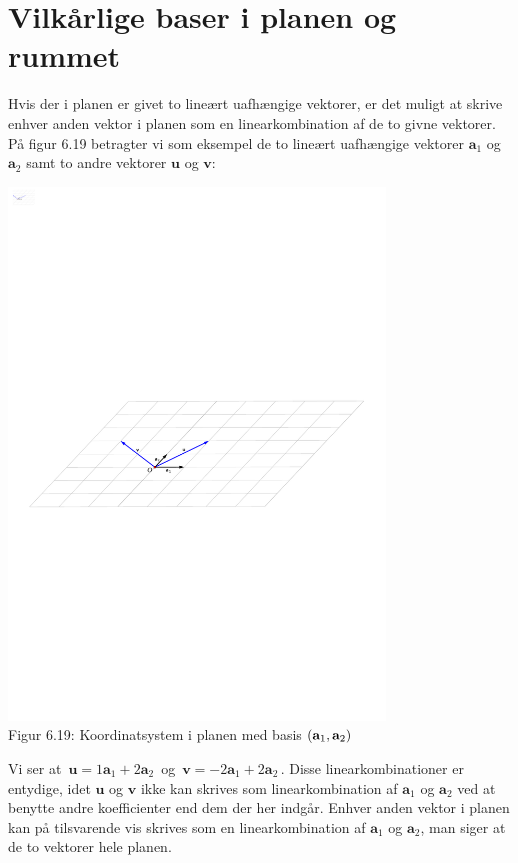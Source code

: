 \section{Vilkårlige baser i planen og rummet}
Hvis der i planen er givet to lineært uafhængige vektorer, er det muligt at skrive enhver anden vektor i planen som en linearkombination af de to givne vektorer. På figur 6.19 betragter vi som eksempel de to lineært uafhængige vektorer $\mathbf a_1$ og $\mathbf a_2$ samt to andre vektorer $\mathbf u$ og $\mathbf v$:

\begin{center}
		\includegraphics[trim=4cm 13cm 7.5cm 13.5cm,width=0.75\textwidth,clip]{geometer/abasis00ny.pdf}	
		\\Figur 6.19: Koordinatsystem i planen med basis $(\mathbf{a}_1,\mathbf{a}_2)$			
\end{center}
Vi ser at $\,\mathbf u=1\mathbf a_1+2\mathbf a_2\,$ og $\,\mathbf v=-2\mathbf a_1+2\mathbf a_2\,$. Disse linearkombinationer er entydige, idet $\mathbf u$ og $\mathbf v$ ikke kan skrives som linearkombination af $\mathbf a_1$ og $\mathbf a_2$ ved at benytte andre koefficienter end dem der her indgår. Enhver anden vektor i planen kan på tilsvarende vis skrives som en linearkombination af $\mathbf a_1$ og $\mathbf a_2$, man siger at de to vektorer  hele planen.\\

